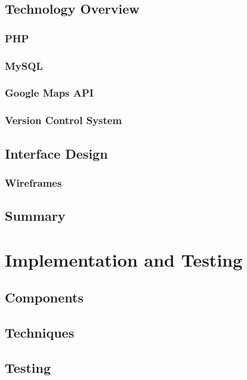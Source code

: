 \documentclass[authoryearcitations]{UoYCSproject}
\begin{document}
\section{Technology Overview}

\subsection{PHP}

\subsection{MySQL}

\subsection{Google Maps API}

\subsection{Version Control System}

\section{Interface Design}

\subsection{Wireframes}

\section{Summary}

\chapter{Implementation and Testing}

\section{Components}

\section{Techniques}

\section{Testing}
\end{document}

